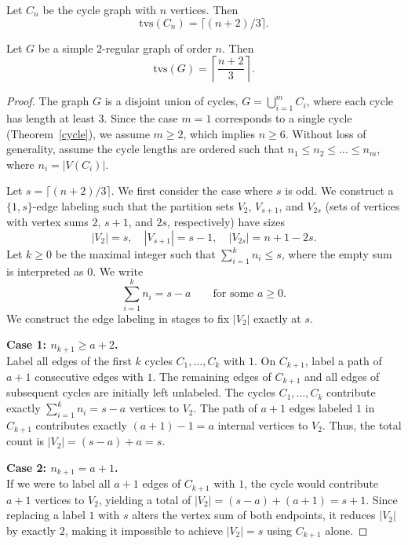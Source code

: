 \documentclass[10pt,a4paper]{amsart}
\newcommand{\tvs}{\mathrm{tvs}}
\begin{document}
\begin{thm}\label{cycle}
Let \(C_n\) be the cycle graph with \(n\) vertices. Then
\[
\mathrm{tvs}(C_n) = \lceil (n+2)/3 \rceil.
\]
\end{thm}

\begin{thm}
Let $G$ be a simple $2$-regular graph of order $n$. Then
\[
\tvs(G)=\left \lceil \frac{n+2}{3}\right\rceil.
\]
\end{thm}

\begin{proof}
The graph $G$ is a disjoint union of cycles, $G=\bigcup_{i=1}^m C_i$, where each cycle has length at least $3$. Since the case $m=1$ corresponds to a single cycle (Theorem~\ref{cycle}), we assume $m\ge 2$, which implies $n\ge 6$. Without loss of generality, assume the cycle lengths are ordered such that $n_1 \le n_2 \le \dots \le n_m$, where $n_i = |V(C_i)|$.

Let $s=\lceil (n+2)/3\rceil$. We first consider the case where $s$ is odd. We construct a $\{1,s\}$-edge labeling such that the partition sets $V_2$, $V_{s+1}$, and $V_{2s}$ (sets of vertices with vertex sums $2$, $s+1$, and $2s$, respectively) have sizes
\[
|V_2|=s, \quad |V_{s+1}|=s-1, \quad |V_{2s}|=n+1-2s.
\]
Let $k\ge 0$ be the maximal integer such that $\sum_{i=1}^{k} n_i \le s$, where the empty sum is interpreted as $0$. We write
\[
\sum_{i=1}^{k} n_i = s-a \qquad \text{for some } a \ge 0.
\]
We construct the edge labeling in stages to fix $|V_2|$ exactly at $s$.

\smallskip
\noindent
\textbf{Case 1: $n_{k+1} \ge a+2$.} \\
Label all edges of the first $k$ cycles $C_1, \dots, C_k$ with $1$. On $C_{k+1}$, label a path of $a+1$ consecutive edges with $1$. The remaining edges of $C_{k+1}$ and all edges of subsequent cycles are initially left unlabeled. The cycles $C_1, \dots, C_k$ contribute exactly $\sum_{i=1}^k n_i = s-a$ vertices to $V_2$. The path of $a+1$ edges labeled $1$ in $C_{k+1}$ contributes exactly $(a+1)-1 = a$ internal vertices to $V_2$. Thus, the total count is $|V_2| = (s-a) + a = s$.

\smallskip
\noindent
\textbf{Case 2: $n_{k+1} = a+1$.} \\
If we were to label all $a+1$ edges of $C_{k+1}$ with $1$, the cycle would contribute $a+1$ vertices to $V_2$, yielding a total of $|V_2| = (s-a) + (a+1) = s+1$. Since replacing a label $1$ with $s$ alters the vertex sum of both endpoints, it reduces $|V_2|$ by exactly $2$, making it impossible to achieve $|V_2|=s$ using $C_{k+1}$ alone.


\end{proof}
\end{document}
